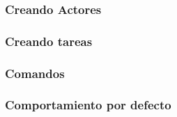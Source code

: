 \subsubsection*{Creando Actores}

\subsubsection*{Creando tareas}

\subsubsection*{Comandos}

\subsubsection*{Comportamiento por defecto}




